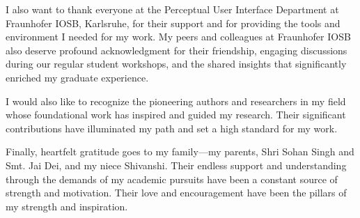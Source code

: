 \documentclass{report} %
\begin{document}
I also want to thank everyone at the Perceptual User Interface Department at Fraunhofer IOSB, Karlsruhe, for their support and for providing the tools and environment I needed for my work. My peers and colleagues at Fraunhofer IOSB also deserve profound acknowledgment for their friendship, engaging discussions during our regular student workshops, and the shared insights that significantly enriched my graduate experience.

I would also like to recognize the pioneering authors and researchers in my field whose foundational work has inspired and guided my research. Their significant contributions have illuminated my path and set a high standard for my work.

Finally, heartfelt gratitude goes to my family—my parents, Shri Sohan Singh and Smt. Jai Dei, and my niece Shivanshi. Their endless support and understanding through the demands of my academic pursuits have been a constant source of strength and motivation. Their love and encouragement have been the pillars of my strength and inspiration.

\newpage
\tableofcontents

\newpage
\listoffigures

\newpage
\listoftables

\newpage
\printglossary[type=\acronymtype]
\end{document}
